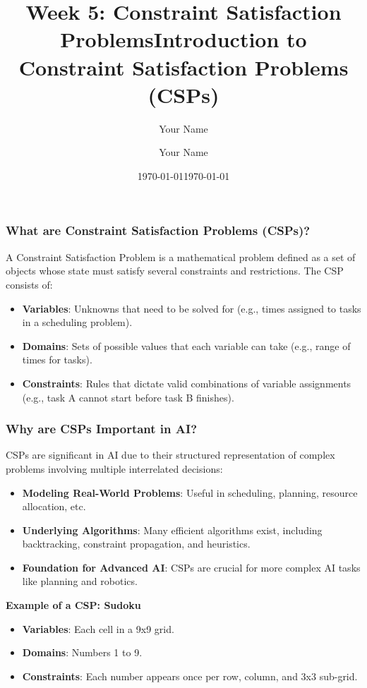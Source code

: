 \documentclass[aspectratio=169]{beamer}
\title[Constraint Satisfaction Problems]{Week 5: Constraint Satisfaction Problems}
\author[Your Name]{Your Name}
\institute[Your Institution]{Your Institution}
\date{\today}
\begin{document}
\frame{\titlepage}

\begin{frame}[fragile]
    \title{Introduction to Constraint Satisfaction Problems (CSPs)}
    \author{Your Name}
    \date{\today}
    \maketitle
\end{frame}

\begin{frame}[fragile]
    \frametitle{What are Constraint Satisfaction Problems (CSPs)?}
    A Constraint Satisfaction Problem is a mathematical problem defined as a set of objects whose state must satisfy several constraints and restrictions. The CSP consists of:
    
    \begin{itemize}
        \item \textbf{Variables}: Unknowns that need to be solved for (e.g., times assigned to tasks in a scheduling problem).
        \item \textbf{Domains}: Sets of possible values that each variable can take (e.g., range of times for tasks).
        \item \textbf{Constraints}: Rules that dictate valid combinations of variable assignments (e.g., task A cannot start before task B finishes).
    \end{itemize}
\end{frame}

\begin{frame}[fragile]
    \frametitle{Why are CSPs Important in AI?}
    CSPs are significant in AI due to their structured representation of complex problems involving multiple interrelated decisions:
    
    \begin{itemize}
        \item \textbf{Modeling Real-World Problems}: Useful in scheduling, planning, resource allocation, etc.
        \item \textbf{Underlying Algorithms}: Many efficient algorithms exist, including backtracking, constraint propagation, and heuristics.
        \item \textbf{Foundation for Advanced AI}: CSPs are crucial for more complex AI tasks like planning and robotics.
    \end{itemize}
    
    \textbf{Example of a CSP: Sudoku}
    \begin{itemize}
        \item \textbf{Variables}: Each cell in a 9x9 grid.
        \item \textbf{Domains}: Numbers 1 to 9.
        \item \textbf{Constraints}: Each number appears once per row, column, and 3x3 sub-grid.
    \end{itemize}
\end{frame}
\end{document}
